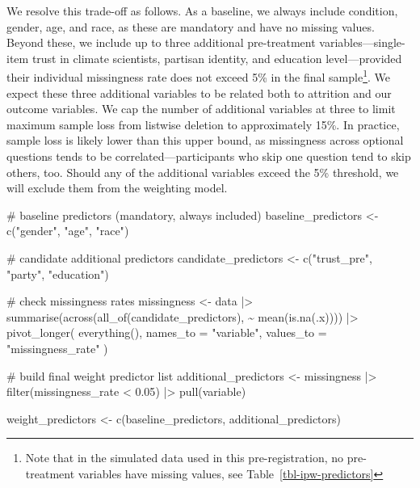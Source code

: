 \documentclass[
  letterpaper,
  DIV=11,
  numbers=noendperiod]{scrartcl}
\newenvironment{Shaded}{\begin{snugshade}}{\end{snugshade}}
\newcommand{\AttributeTok}[1]{\textcolor[rgb]{0.40,0.45,0.13}{#1}}
\newcommand{\CommentTok}[1]{\textcolor[rgb]{0.37,0.37,0.37}{#1}}
\newcommand{\FloatTok}[1]{\textcolor[rgb]{0.68,0.00,0.00}{#1}}
\newcommand{\FunctionTok}[1]{\textcolor[rgb]{0.28,0.35,0.67}{#1}}
\newcommand{\NormalTok}[1]{\textcolor[rgb]{0.00,0.23,0.31}{#1}}
\newcommand{\OtherTok}[1]{\textcolor[rgb]{0.00,0.23,0.31}{#1}}
\newcommand{\SpecialCharTok}[1]{\textcolor[rgb]{0.37,0.37,0.37}{#1}}
\newcommand{\StringTok}[1]{\textcolor[rgb]{0.13,0.47,0.30}{#1}}
\begin{document}
We resolve this trade-off as follows. As a baseline, we always include
condition, gender, age, and race, as these are mandatory and have no
missing values. Beyond these, we include up to three additional
pre-treatment variables---single-item trust in climate scientists,
partisan identity, and education level---provided their individual
missingness rate does not exceed 5\% in the final sample\footnote{Note
  that in the simulated data used in this pre-registration, no
  pre-treatment variables have missing values, see
  Table~\ref{tbl-ipw-predictors}}. We expect these three additional
variables to be related both to attrition and our outcome variables. We
cap the number of additional variables at three to limit maximum sample
loss from listwise deletion to approximately 15\%. In practice, sample
loss is likely lower than this upper bound, as missingness across
optional questions tends to be correlated---participants who skip one
question tend to skip others, too. Should any of the additional
variables exceed the 5\% threshold, we will exclude them from the
weighting model.

\begin{Shaded}
\begin{Highlighting}[]
\CommentTok{\# baseline predictors (mandatory, always included)}
\NormalTok{baseline\_predictors }\OtherTok{\textless{}{-}} \FunctionTok{c}\NormalTok{(}\StringTok{"gender"}\NormalTok{, }\StringTok{"age"}\NormalTok{, }\StringTok{"race"}\NormalTok{)}

\CommentTok{\# candidate additional predictors}
\NormalTok{candidate\_predictors }\OtherTok{\textless{}{-}} \FunctionTok{c}\NormalTok{(}\StringTok{"trust\_pre"}\NormalTok{, }\StringTok{"party"}\NormalTok{, }\StringTok{"education"}\NormalTok{)}

\CommentTok{\# check missingness rates}
\NormalTok{missingness }\OtherTok{\textless{}{-}}\NormalTok{ data }\SpecialCharTok{|\textgreater{}}
  \FunctionTok{summarise}\NormalTok{(}\FunctionTok{across}\NormalTok{(}\FunctionTok{all\_of}\NormalTok{(candidate\_predictors), }\SpecialCharTok{\textasciitilde{}} \FunctionTok{mean}\NormalTok{(}\FunctionTok{is.na}\NormalTok{(.x)))) }\SpecialCharTok{|\textgreater{}}
  \FunctionTok{pivot\_longer}\NormalTok{(}
    \FunctionTok{everything}\NormalTok{(),}
    \AttributeTok{names\_to =} \StringTok{"variable"}\NormalTok{,}
    \AttributeTok{values\_to =} \StringTok{"missingness\_rate"}
\NormalTok{  )}

\CommentTok{\# build final weight predictor list}
\NormalTok{additional\_predictors }\OtherTok{\textless{}{-}}\NormalTok{ missingness }\SpecialCharTok{|\textgreater{}}
  \FunctionTok{filter}\NormalTok{(missingness\_rate }\SpecialCharTok{\textless{}} \FloatTok{0.05}\NormalTok{) }\SpecialCharTok{|\textgreater{}}
  \FunctionTok{pull}\NormalTok{(variable)}

\NormalTok{weight\_predictors }\OtherTok{\textless{}{-}} \FunctionTok{c}\NormalTok{(baseline\_predictors, additional\_predictors)}
\end{Highlighting}
\end{Shaded}
\end{document}

